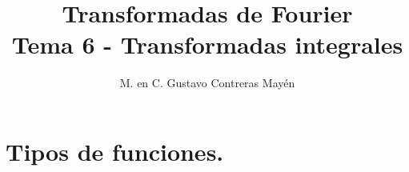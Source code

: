 
\title{Transformadas de Fourier \\ \large {Tema 6 - Transformadas integrales} \vspace{-3ex}}
\author{M. en C. Gustavo Contreras Mayén}
\date{ }

\vspace{-4cm}
\maketitle
\fontsize{14}{14}\selectfont
\tableofcontents
\newpage

\section{Tipos de funciones.}

